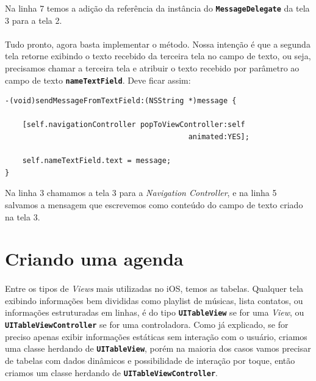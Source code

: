 \documentclass[a4paper,12pt,brazil,doubleside]{book}
\begin{document}
Na linha 7 temos a adição da referência da instância do \texttt{\textbf{MessageDelegate}} da tela 3 para a tela 2.

\paragraph{}Tudo pronto, agora basta implementar o método. Nossa intenção é que a segunda tela retorne exibindo o texto recebido da terceira tela no campo de texto, ou seja, precisamos chamar a terceira tela e atribuir o texto recebido por parâmetro ao campo de texto \texttt{\textbf{nameTextField}}. Deve ficar assim:

\begin{listing}
\begin{verbatim}
-(void)sendMessageFromTextField:(NSString *)message {
    
    [self.navigationController popToViewController:self
                                          animated:YES];
    
    self.nameTextField.text = message;
}
\end{verbatim}
\end{listing}

Na linha 3 chamamos a tela 3 para a \emph{Navigation Controller}, e na linha 5 salvamos a mensagem que escrevemos como conteúdo do campo de texto criado na tela 3.

\bigskip


\section{Criando uma agenda}

\paragraph{}Entre os tipos de \emph{Views} mais utilizadas no iOS, temos as tabelas. Qualquer tela exibindo informações bem divididas como playlist de músicas, lista contatos, ou informações estruturadas em linhas, é do tipo \texttt{\textbf{UITableView}} se for uma \emph{View}, ou \texttt{\textbf{UITableViewController}} se for uma controladora. Como já explicado, se for preciso apenas exibir informações estáticas sem interação com o usuário, criamos uma classe herdando de \texttt{\textbf{UITableView}}, porém na maioria dos casos vamos precisar de tabelas com dados dinâmicos e possibilidade de interação por toque, então criamos um classe herdando de \texttt{\textbf{UITableViewController}}.
\end{document}
